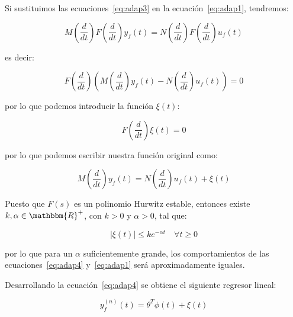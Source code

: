         Si sustituimos las ecuaciones~\ref{eq:adap3} en la ecuación~\ref{eq:adap1}, tendremos:

        \begin{equation*}
            M \left( \frac{d}{dt} \right) F \left( \frac{d}{dt} \right) y_f (t) = N \left( \frac{d}{dt} \right) F \left( \frac{d}{dt} \right) u_f (t)
        \end{equation*}

        es decir:

        \begin{equation*}
            F \left( \frac{d}{dt} \right) \left( M \left( \frac{d}{dt} \right)  y_f (t) - N \left( \frac{d}{dt} \right) u_f (t) \right) = 0
        \end{equation*}

        por lo que podemos introducir la función $\xi(t)$:

        \begin{equation*}
            F \left( \frac{d}{dt} \right) \xi(t) = 0
        \end{equation*}

        por lo que podemos escribir nuestra función original como:

        \begin{equation} \label{eq:adap4}
            M \left( \frac{d}{dt} \right) y_f(t) = N \left( \frac{d}{dt} \right) u_f(t) + \xi(t)
        \end{equation}

        Puesto que $F(s)$ es un polinomio Hurwitz estable, entonces existe $k, \alpha \in \mathbbm{R}^+$, con $k > 0$ y $\alpha > 0$, tal que:

        \begin{equation*}
            |\xi(t)| \le k e^{- \alpha t} \quad \forall t \ge 0
        \end{equation*}


        por lo que para un $\alpha$ suficientemente grande, los comportamientos de las ecuaciones~\ref{eq:adap4} y~\ref{eq:adap1} será aproximadamente iguales.

        Desarrollando la ecuación~\ref{eq:adap4} se obtiene el siguiente regresor lineal:

        \begin{equation}
            y_f^{(n)}(t) = \theta^T \phi(t) + \xi(t)
        \end{equation}

